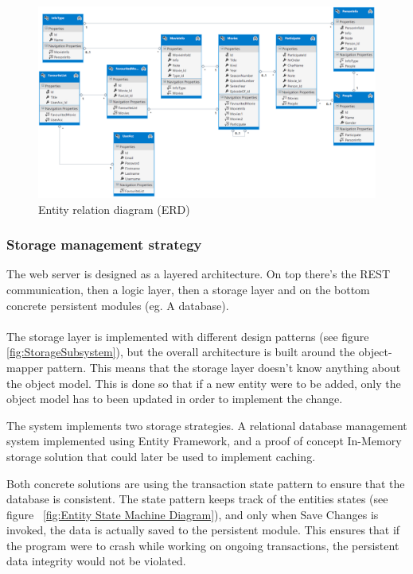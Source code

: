 \begin{figure}[H]
\includegraphics[width=\linewidth]{img/SDD/ER.png}
\caption{Entity relation diagram (ERD)}
\label{fig:ER Diagram}
\end{figure}

\subsubsection{Storage management strategy}
The web server is designed as a layered architecture. On top there's the REST communication, then a logic layer, then a storage layer and on the bottom concrete persistent modules (eg. A database).\\\\
The storage layer is implemented with different design patterns (see figure \ref{fig:StorageSubsystem}), but the overall architecture is built around the object-mapper pattern. This means that the storage layer doesn't know anything about the object model. This is done so that if a new entity were to be added, only the object model has to been updated in order to implement the change. 

The system implements two storage strategies. A relational database management system implemented using Entity Framework, and a proof of concept In-Memory storage solution that could later be used to implement caching. 

Both concrete solutions are using the transaction state pattern to ensure that the database is consistent. The state pattern keeps track of the entities states (see figure ~\ref{fig:Entity State Machine Diagram}), and only when Save Changes is invoked, the data is actually saved to the persistent module. This ensures that if the program were to crash while working on ongoing transactions, the persistent data integrity would not be violated.  

